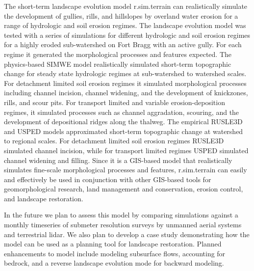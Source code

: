 \documentclass[gmd, manuscript]{copernicus}
\begin{document}
\conclusions

The short-term landscape evolution model 
r.sim.terrain 
can realistically simulate the development of 
gullies, rills, and hillslopes by overland water erosion
for a range of hydrologic and soil erosion regimes.
The landscape evolution model was tested
with a series of simulations for different 
hydrologic and soil erosion regimes
for a highly eroded sub-watershed on Fort Bragg
with an active gully.
For each regime it generated the 
morphological processes and features expected.
The physics-based SIMWE model 
realistically simulated short-term topographic change
for steady state hydrologic regimes
at sub-watershed to watershed scales. 
For detachment limited soil erosion regimes
it simulated morphological processes including
channel incision, channel widening, and 
the development of knickzones, rills, and scour pits.
For transport limited and variable erosion-deposition regimes,
it simulated processes such as channel aggradation,
scouring, and the development of
depositional ridges along the thalweg.
The empirical RUSLE3D and USPED models
approximated short-term topographic change
at watershed to regional scales. 
For detachment limited soil erosion regimes 
RUSLE3D simulated channel incision,
while for transport limited regimes
USPED simulated channel widening and filling. 
Since it is a GIS-based model 
that realistically simulates 
fine-scale morphological processes and features,
r.sim.terrain can easily and effectively be used 
in conjunction with other GIS-based tools
for geomorphological research,
land management and conservation,
erosion control, and landscape restoration. 


In the future we plan to assess this model
by comparing simulations against 
a monthly timeseries
of submeter resolution surveys
by unmanned aerial systems and terrestrial lidar. 
We also plan to develop a case study demonstrating
how the model can be used as a planning tool 
for landscape restoration. 
Planned enhancements to model include 
modeling subsurface flows, 
accounting for bedrock, 
and a reverse landscape evolution mode
for backward modeling. 

\end{document}

